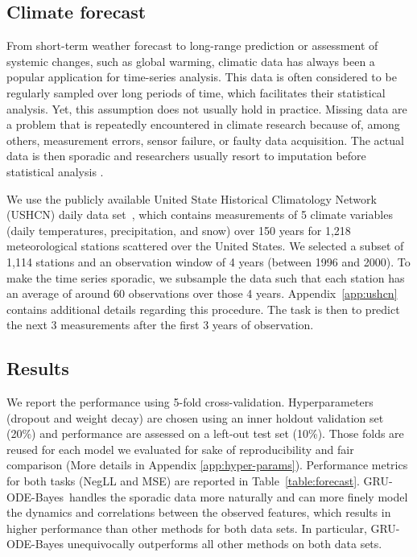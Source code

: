 \documentclass{article}
\newcommand{\method}{GRU-ODE-Bayes}
\begin{document}
\subsection{Climate forecast}

From short-term weather forecast to long-range prediction or assessment of systemic changes, such as global warming, climatic data has always been a popular application for time-series analysis. This data is often considered to be regularly sampled over long periods of time, which facilitates their statistical analysis. Yet, this assumption does not usually hold in practice. Missing data are a problem that is repeatedly encountered in climate research because of, among others, measurement errors, sensor failure, or faulty data acquisition. The actual data is then sporadic and researchers usually resort to imputation before statistical analysis  \citep{junninen2004methods,schneider2001analysis}.

We use the publicly available United State Historical Climatology Network (USHCN) daily data set~\citep{ushcn}, which contains measurements of 5 climate variables (daily temperatures, precipitation, and snow) over 150 years for 1,218 meteorological stations scattered over the United States. We selected a subset of 1,114 stations and an observation window of 4 years (between 1996 and 2000). To make the time series sporadic, we subsample the data such that each station has an average of around 60 observations over those 4 years. Appendix~\ref{app:ushcn} contains additional details regarding this procedure. The task is then to predict the next 3 measurements after the first 3 years of observation.


\subsection{Results}
We report the performance using 5-fold cross-validation. Hyperparameters (dropout and weight decay) are chosen using an inner holdout validation set (20\%) and performance are assessed on a left-out test set (10\%). Those folds are reused for each model we evaluated for sake of reproducibility and fair comparison (More details in Appendix \ref{app:hyper-params}). Performance metrics for both tasks (NegLL and MSE) are reported in Table~\ref{table:forecast}. \method~handles the sporadic data more naturally and can more finely model the dynamics and correlations between the observed features, which results in higher performance than other methods for both data sets. In particular, \method{} unequivocally outperforms all other methods on both data sets.
\end{document}
